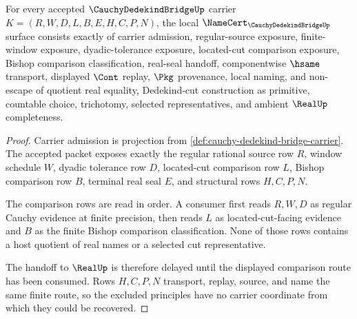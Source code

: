\begin{theorem}\label{thm:cauchy-dedekind-bridge-namecert-obligations}
For every accepted $\CauchyDedekindBridgeUp$ carrier $K=(R,W,D,L,B,E,H,C,P,N)$, the local $\NameCert_{\CauchyDedekindBridgeUp}$ surface consists exactly of carrier admission, regular-source exposure, finite-window exposure, dyadic-tolerance exposure, located-cut comparison exposure, Bishop comparison classification, real-seal handoff, componentwise $\hsame$ transport, displayed $\Cont$ replay, $\Pkg$ provenance, local naming, and non-escape of quotient real equality, Dedekind-cut construction as primitive, countable choice, trichotomy, selected representatives, and ambient $\RealUp$ completeness.
\end{theorem}
\begin{proof}
Carrier admission is projection from \autoref{def:cauchy-dedekind-bridge-carrier}. The accepted packet exposes exactly the regular rational source row $R$, window schedule $W$, dyadic tolerance row $D$, located-cut comparison row $L$, Bishop comparison row $B$, terminal real seal $E$, and structural rows $H,C,P,N$.

The comparison rows are read in order. A consumer first reads $R,W,D$ as regular Cauchy evidence at finite precision, then reads $L$ as located-cut-facing evidence and $B$ as the finite Bishop comparison classification. None of those rows contains a host quotient of real names or a selected cut representative.

The handoff to $\RealUp$ is therefore delayed until the displayed comparison route has been consumed. Rows $H,C,P,N$ transport, replay, source, and name the same finite route, so the excluded principles have no carrier coordinate from which they could be recovered.
\end{proof}

